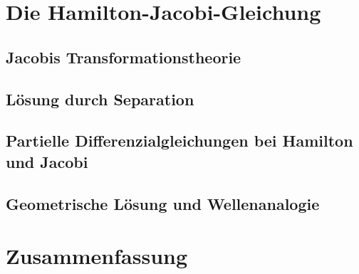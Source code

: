 \documentclass{beamer}
\begin{document}
\section{Die Hamilton-Jacobi-Gleichung}

    \subsection{Jacobis Transformationstheorie}
    
    \subsection{Lösung durch Separation}
    
    \subsection{Partielle Differenzialgleichungen bei Hamilton und Jacobi}

    \subsection{Geometrische Lösung und Wellenanalogie}

\section{Zusammenfassung}
\end{document}
